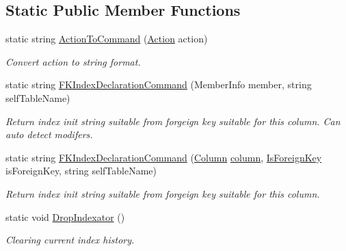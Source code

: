 \subsection*{Static Public Member Functions}
\begin{DoxyCompactItemize}
\item 
static string \mbox{\hyperlink{class_uniform_data_operator_1_1_sql_1_1_attributes_1_1_is_foreign_key_a2673778ee437ef079b99d58636f7617b}{Action\+To\+Command}} (\mbox{\hyperlink{class_uniform_data_operator_1_1_sql_1_1_attributes_1_1_is_foreign_key_a6039622384e2bbd1aa386e326ee0f850}{Action}} action)
\begin{DoxyCompactList}\small\item\em Convert action to string format. \end{DoxyCompactList}\item 
static string \mbox{\hyperlink{class_uniform_data_operator_1_1_sql_1_1_attributes_1_1_is_foreign_key_a8d5c79de848dd87916ab946972db0188}{F\+K\+Index\+Declaration\+Command}} (Member\+Info member, string self\+Table\+Name)
\begin{DoxyCompactList}\small\item\em Return index init string suitable from forgeign key suitable for this column. Can auto detect modifers. \end{DoxyCompactList}\item 
static string \mbox{\hyperlink{class_uniform_data_operator_1_1_sql_1_1_attributes_1_1_is_foreign_key_a6becd6dc4bd6df070252b152a57f0152}{F\+K\+Index\+Declaration\+Command}} (\mbox{\hyperlink{class_uniform_data_operator_1_1_sql_1_1_attributes_1_1_column}{Column}} \mbox{\hyperlink{class_uniform_data_operator_1_1_sql_1_1_attributes_1_1_is_foreign_key_a8d14eef86991a9e1a187876626cbb70b}{column}}, \mbox{\hyperlink{class_uniform_data_operator_1_1_sql_1_1_attributes_1_1_is_foreign_key}{Is\+Foreign\+Key}} is\+Foreign\+Key, string self\+Table\+Name)
\begin{DoxyCompactList}\small\item\em Return index init string suitable from forgeign key suitable for this column. \end{DoxyCompactList}\item 
static void \mbox{\hyperlink{class_uniform_data_operator_1_1_sql_1_1_attributes_1_1_is_foreign_key_aba50c9adf8e4fac95010d26a17b54644}{Drop\+Indexator}} ()
\begin{DoxyCompactList}\small\item\em Clearing current index history. \end{DoxyCompactList}\item 

\end{DoxyCompactItemize}
